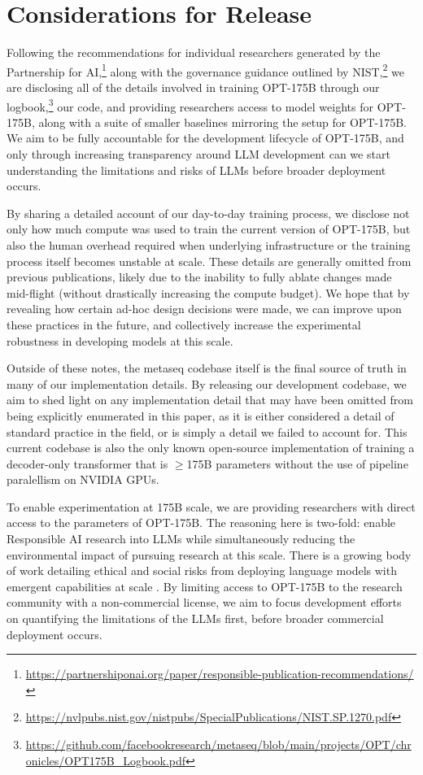 \section{Considerations for Release}
\label{sec:release}
Following the recommendations for individual researchers generated by the Partnership for AI,\footnote{\url{https://partnershiponai.org/paper/responsible-publication-recommendations/}} along with the governance guidance outlined by NIST,\footnote{\url{https://nvlpubs.nist.gov/nistpubs/SpecialPublications/NIST.SP.1270.pdf}} we are disclosing all of the details involved in training OPT-175B through our logbook,\footnote{\url{https://github.com/facebookresearch/metaseq/blob/main/projects/OPT/chronicles/OPT175B_Logbook.pdf}} our code, and providing researchers access to model weights for {OPT-175B}, along with a suite of smaller baselines mirroring the setup for {OPT-175B}.  We aim to be fully accountable for the development lifecycle of {OPT-175B}, and only through increasing transparency around LLM development can we start understanding the limitations and risks of LLMs before broader deployment occurs.

By sharing a detailed account of our day-to-day training process, we disclose not only how much compute was used to train the current version of OPT-175B, but also the human overhead required when underlying infrastructure or the training process itself becomes unstable at scale.  These details are generally omitted from previous publications, likely due to the inability to fully ablate changes made mid-flight (without drastically increasing the compute budget).  We hope that by revealing how certain ad-hoc design decisions were made, we can improve upon these practices in the future, and collectively increase the experimental robustness in developing models at this scale.

Outside of these notes, the metaseq codebase itself is the final source of truth in many of our implementation details.  By releasing our development codebase, we aim to shed light on any implementation detail that may have been omitted from being explicitly enumerated in this paper, as it is either considered a detail of standard practice in the field, or is simply a detail we failed to account for.  This current codebase is also the only known open-source implementation of training a decoder-only transformer that is $\geq$175B parameters without the use of pipeline paralellism on NVIDIA GPUs.

To enable experimentation at 175B scale, we are providing researchers with direct access to the parameters of {OPT-175B}. The reasoning here is two-fold: enable Responsible AI research into LLMs while simultaneously reducing the environmental impact of pursuing research at this scale.  There is a growing body of work detailing ethical and social risks from deploying language models with emergent capabilities at scale \cite{deepmindLMrisks2021,foundation2021,dinan2021anticipating,alignmentagents2021}. By limiting access to {OPT-175B} to the research community with a non-commercial license, we aim to focus development efforts on quantifying the limitations of the LLMs first, before broader commercial deployment occurs.

